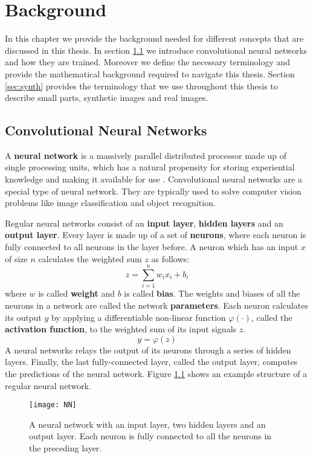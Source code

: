 \chapter{Background}\label{ch:background}
In this chapter we provide the background needed for different concepts that are discussed in this thesis. In section \ref{sec:cnn} we introduce convolutional neural networks and how they are trained. Moreover we define the necessary terminology and provide the mathematical background required to navigate this thesis. Section \ref{sec:synth} provides the terminology that we use throughout this thesis to describe small parts, synthetic images and real images.


\section{Convolutional Neural Networks}\label{sec:cnn}
A \textbf{neural network} is a massively parallel distributed processor made up of single processing units, which has a natural propensity for storing experiential knowledge and making it available for use \cite{haykin1994neural}. Convolutional neural networks are a special type of neural network. They are typically used to solve computer vision problems like image classification and object recognition.

Regular neural networks consist of an \textbf{input layer}, \textbf{hidden layers} and an \textbf{output layer}. Every layer is made up of a set of \textbf{neurons}, where each neuron is fully connected to all neurons in the layer before. A neuron which has an input $x$ of size $n$ calculates the weighted sum $z$ as follows: \[ z = \sum_{i=1}^n w_ix_i + b_i \] where $w$ is called \textbf{weight} and $b$ is called \textbf{bias}. The weights and biases of all the neurons in a network are called the network \textbf{parameters}. Each neuron calculates its output $y$ by applying a differentiable non-linear function $\varphi(\cdot)$, called the \textbf{activation function}, to the weighted sum of its input signals $z$. \[y = \varphi(z)\] A neural networks relays the output of its neurons through a series of hidden layers. Finally, the last fully-connected layer, called the output layer, computes the predictions of the neural network. Figure \ref{fig:NN} shows an example structure of a regular neural network.

\begin{figure}[H]
\centering
\texttt{[image: NN]}
\caption[A neural network with an input layer, two hidden layers and an output layer. Each neuron is fully connected to all the neurons in the preceding layer.]{A neural network with an input layer, two hidden layers and an output layer. Each neuron is fully connected to all the neurons in the preceding layer.\footnotemark}
\label{fig:NN}
\end{figure}


